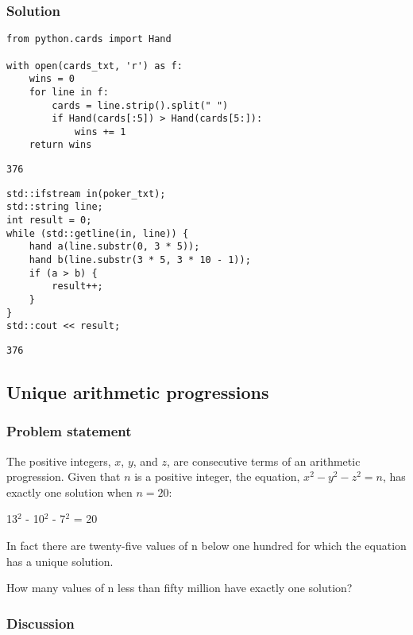 \documentclass[11pt]{article}
\begin{document}
\subsubsection{Solution}
\label{sec:orgheadline16}
\begin{verbatim}
from python.cards import Hand

with open(cards_txt, 'r') as f:
    wins = 0
    for line in f:
        cards = line.strip().split(" ")
        if Hand(cards[:5]) > Hand(cards[5:]):
            wins += 1
    return wins
\end{verbatim}

\begin{verbatim}
376
\end{verbatim}

\begin{verbatim}
std::ifstream in(poker_txt);
std::string line;
int result = 0;
while (std::getline(in, line)) {
    hand a(line.substr(0, 3 * 5));
    hand b(line.substr(3 * 5, 3 * 10 - 1));
    if (a > b) {
        result++;
    }
}
std::cout << result;
\end{verbatim}

\begin{verbatim}
376
\end{verbatim}
\subsection{Unique arithmetic progressions}
\label{sec:orgheadline20}
\subsubsection{Problem statement}
\label{sec:orgheadline18}
The positive integers, \(x\), \(y\), and \(z\), are consecutive terms of an
arithmetic progression.  Given that \(n\) is a positive integer, the equation,
\(x^2-y^2-z^2 = n\), has exactly one solution when \(n = 20\):

13\(^{\text{2}}\) - 10\(^{\text{2}}\) - 7\(^{\text{2}}\) = 20

In fact there are twenty-five values of n below one hundred for which the
equation has a unique solution.

How many values of n less than fifty million have exactly one solution?

\subsubsection{Discussion}
\label{sec:orgheadline19}
\end{document}
